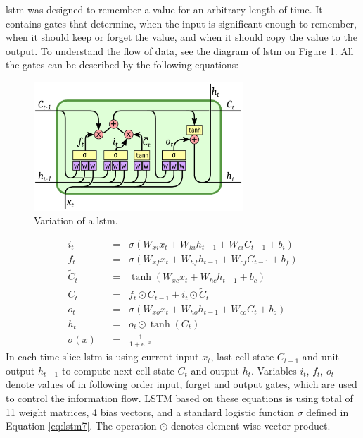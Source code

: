 \gls{lstm} was designed to remember a value for an arbitrary length of time. It contains gates that determine, when the input is significant enough to remember, when it should keep or forget the value, and when it should copy the value to the output. To understand the flow of data, see the diagram of \gls{lstm} on Figure \ref{fig:lstm}. All the gates can be described by the following equations:
\begin{figure}[!t]
	\centering
	\includegraphics[width=0.7\textwidth]{./fig/lstm-peepholes.pdf}
	\caption{Variation of a \gls{lstm}.
		\label{fig:lstm}}
\end{figure}
\belowdisplayskip=18pt
\begin{align}
	i_t \hspace{7pt}&=\hspace{7pt} \sigma(W_{xi}x_t + W_{hi}h_{t-1} + W_{ci}C_{t-1} + b_i) \label{eq:lstm1}\\
	f_t \hspace{7pt}&=\hspace{7pt} \sigma(W_{xf}x_t + W_{hf}h_{t-1} + W_{cf}C_{t-1} + b_f) \label{eq:lstm2}\\
	\widetilde{C}_t\hspace{7pt}&=\hspace{7pt} \tanh(W_{xc}x_t + W_{hc}h_{t-1} + b_c) \label{eq:lstm3}\\
	C_t \hspace{7pt}&=\hspace{7pt} f_t\odot C_{t-1} + i_t\odot \widetilde{C}_t \label{eq:lstm4}\\
	o_t \hspace{7pt}&=\hspace{7pt} \sigma(W_{xo}x_t + W_{ho}h_{t-1} + W_{co}C_t + b_o) \label{eq:lstm5}\\
	h_t \hspace{7pt}&=\hspace{7pt} o_t\odot \tanh(C_t) \label{eq:lstm6}\\[16pt]
	\sigma(x) \hspace{7pt}&=\hspace{7pt} \frac{1}{1+e^{-x}} \label{eq:lstm7}
\end{align}
In each time slice \gls{lstm} is using current input $ x_t $, last cell state $ C_{t-1} $ and unit output $ h_{t-1} $ to compute next cell state $ C_t $ and output $ h_t $. Variables $ i_t $, $ f_t $, $ o_t $ denote values of in following order input, forget and output gates, which are used to control the information flow. LSTM based on these equations is using total of 11 weight matrices, 4 bias vectors, and a standard logistic function $ \sigma $ defined in Equation \eqref{eq:lstm7}. The operation $ \odot $ denotes element-wise vector product.

